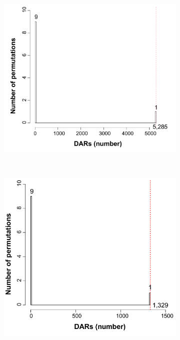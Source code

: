 \begin{figure}[htbp]
\centering
\begin{subfigure}[b]{0.45\textwidth}
\centering 
\includegraphics[width=\textwidth]{./Appendix/pdfs/Chapter5/ATAC_PsA_CD14_permutation_analysis}
\caption{}
\end{subfigure}
~
\begin{subfigure}[b]{0.45\textwidth}
\centering 
\includegraphics[width=\textwidth]{./Appendix/pdfs/Chapter5/ATAC_PsA_CD4_permutation_analysis}

\end{subfigure}
\end{figure}
